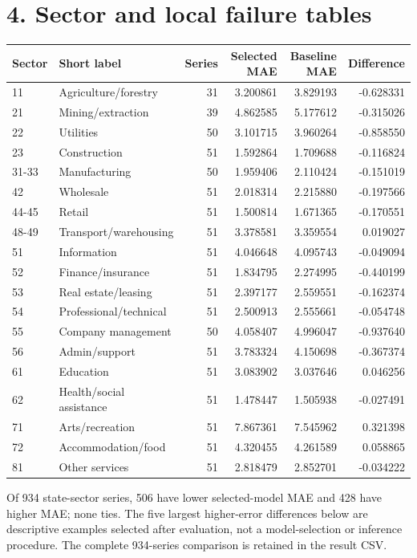 \documentclass[11pt]{article}
\begin{document}
\newpage\section*{4. Sector and local failure tables}
\begin{center}\small\setlength{\tabcolsep}{4pt}
\begin{tabular}{llrrrr}\toprule
Sector & Short label & Series & Selected MAE & Baseline MAE & Difference \\
\midrule
11 & Agriculture/forestry & 31 & 3.200861 & 3.829193 & -0.628331 \\
21 & Mining/extraction & 39 & 4.862585 & 5.177612 & -0.315026 \\
22 & Utilities & 50 & 3.101715 & 3.960264 & -0.858550 \\
23 & Construction & 51 & 1.592864 & 1.709688 & -0.116824 \\
31-33 & Manufacturing & 50 & 1.959406 & 2.110424 & -0.151019 \\
42 & Wholesale & 51 & 2.018314 & 2.215880 & -0.197566 \\
44-45 & Retail & 51 & 1.500814 & 1.671365 & -0.170551 \\
48-49 & Transport/warehousing & 51 & 3.378581 & 3.359554 & 0.019027 \\
51 & Information & 51 & 4.046648 & 4.095743 & -0.049094 \\
52 & Finance/insurance & 51 & 1.834795 & 2.274995 & -0.440199 \\
53 & Real estate/leasing & 51 & 2.397177 & 2.559551 & -0.162374 \\
54 & Professional/technical & 51 & 2.500913 & 2.555661 & -0.054748 \\
55 & Company management & 50 & 4.058407 & 4.996047 & -0.937640 \\
56 & Admin/support & 51 & 3.783324 & 4.150698 & -0.367374 \\
61 & Education & 51 & 3.083902 & 3.037646 & 0.046256 \\
62 & Health/social assistance & 51 & 1.478447 & 1.505938 & -0.027491 \\
71 & Arts/recreation & 51 & 7.867361 & 7.545962 & 0.321398 \\
72 & Accommodation/food & 51 & 4.320455 & 4.261589 & 0.058865 \\
81 & Other services & 51 & 2.818479 & 2.852701 & -0.034222 \\
\bottomrule\end{tabular}\end{center}
Of 934 state-sector series, 506 have lower selected-model MAE and 428 have higher MAE; none ties. The five largest higher-error differences below are descriptive examples selected after evaluation, not a model-selection or inference procedure. The complete 934-series comparison is retained in the result CSV.
\end{document}
